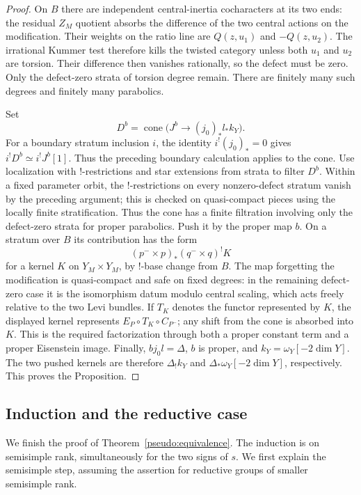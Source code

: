 \documentclass[11pt]{article}
\numberwithin{equation}{section}
\theoremstyle{definition}
\theoremstyle{remark}
\begin{document}
\begin{proof}
On $B$ there are independent central-inertia cocharacters at its two ends:
the residual $Z_M$ quotient absorbs the difference of the two central
actions on the modification.  Their weights on the ratio line are
$Q(z,u_1)$ and $-Q(z,u_2)$.  The irrational Kummer test therefore kills the
twisted category unless both $u_1$ and $u_2$ are torsion.  Their difference
then vanishes rationally, so the defect must be zero.  Only the defect-zero
strata of torsion degree remain.  There are finitely many such degrees and
finitely many parabolics.

Set
\[
 D^b=\operatorname{cone}\bigl(J^b\longrightarrow(j_0)_*l_*k_Y\bigr).
\]
For a boundary stratum inclusion $i$, the identity
$i^!(j_0)_*=0$ gives $i^!D^b\simeq i^!J^b[1]$.  Thus the preceding
boundary calculation applies to the cone.  Use localization with
!-restrictions and star extensions from strata to filter $D^b$.
Within a fixed parameter orbit, the !-restrictions on every nonzero-defect
stratum vanish by the preceding argument; this is checked on
quasi-compact pieces using the locally finite stratification.  Thus the
cone has a finite filtration involving only the defect-zero strata for
proper parabolics.  Push it by the proper map $b$.  On a stratum over $B$
its contribution has the form
\[
 (p^-\times p)_*(q^-\times q)^!K
\]
for a kernel $K$ on $Y_M\times Y_M$, by !-base change from $B$.  The map
forgetting the modification is quasi-compact and safe on fixed degrees:
in the remaining defect-zero case it is the isomorphism datum modulo
central scaling, which acts freely relative to the two Levi bundles.
If $T_K$ denotes the functor represented by $K$, the displayed kernel
represents $E_P\circ T_K\circ C_{P^-}$; any shift from the cone is
absorbed into $K$.  This is the required factorization through both a
proper constant term and a proper Eisenstein image.  Finally, $bj_0l=\Delta$, $b$ is proper, and
$k_Y=\omega_Y[-2\dim Y]$.  The two pushed kernels are therefore
$\Delta_!k_Y$ and $\Delta_*\omega_Y[-2\dim Y]$, respectively.  This proves
the Proposition.
\end{proof}

\subsection{Induction and the reductive case}

We finish the proof of Theorem~\ref{pseudo:equivalence}.  The induction is
on semisimple rank, simultaneously for the two signs of $s$.  We first
explain the semisimple step, assuming the assertion for reductive groups
of smaller semisimple rank.
\end{document}
